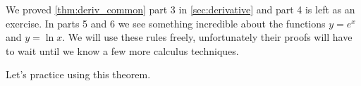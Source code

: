 We proved \autoref{thm:deriv_common} part 3 in \autoref{sec:derivative} and part 4 is left as an exercise.  In parts 5 and 6 we see something incredible about the functions $y=e^x$ and $y=\ln x$. We will use these rules freely, unfortunately their proofs will have to wait until we know a few more calculus techniques.


Let's practice using this theorem.

